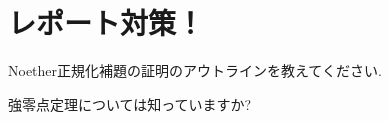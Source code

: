 \newpage 
\section{レポート対策！}


\begin{egprob}
Noether正規化補題の証明のアウトラインを教えてください.
\end{egprob}

\begin{egprob}
強零点定理については知っていますか? 
\end{egprob}











